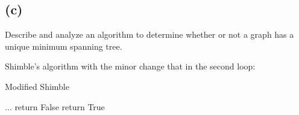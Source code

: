 \documentclass[12pt]{article}
\begin{document}
\subsection*{(c)}
Describe and analyze an algorithm to determine whether or not a graph
has a unique minimum spanning tree.

Shimble's algorithm with the minor change that in the second loop:
\begin{algorithm}
\caption{Modified Shimble}
\begin{algorithmic}
  \STATE
  \STATE $\ldots$
  \STATE
      \STATE return False
    \ENDIF
  \STATE return True
  \ENDFOR
\end{algorithmic}
\end{algorithm}
\end{document}
